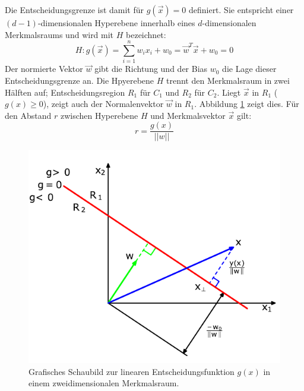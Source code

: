 Die Entscheidungsgrenze ist damit für $g(\vec{x}) = 0$ definiert. Sie entspricht einer $(d-1)$-dimensionalen Hyperebene innerhalb eines $d$-dimensionalen Merkmalsraums und wird mit $H$ bezeichnet:
\[
	H: g(\vec{x}) = \sum_{i=1}^{n} w_i x_i + w_0 = \vec{w}^T \vec{x} + w_0 = 0
\]
Der normierte Vektor $\vec{w}$ gibt die Richtung und der Bias $w_0$ die Lage dieser Entscheidungsgrenze an. Die Hpyerebene $H$ trennt den Merkmalsraum in zwei Hälften auf; Entscheidungsregion $R_1$ für $C_1$ und $R_2$ für $C_2$. Liegt $\vec{x}$ in $R_1$ ($g(x) \ge 0$), zeigt auch der Normalenvektor $\vec{w}$ in $R_1$. Abbildung \ref{fig:lineare-entscheidunsfunktion} zeigt dies. Für den Abstand $r$ zwischen Hyperebene $H$ und Merkmalsvektor $\vec{x}$ gilt:
\[
	r = \frac{g(x)}{||w||}
\]

\begin{figure}[ht!] \centering 
	\includegraphics[width=\linewidth]{figures/ch02_lineare-entscheidungsfunktion.pdf}
	\caption{Grafisches Schaubild zur linearen Entscheidungsfunktion $g(x)$ in einem zweidimensionalen Merkmalsraum.}
	\label{fig:lineare-entscheidunsfunktion}
\end{figure}


